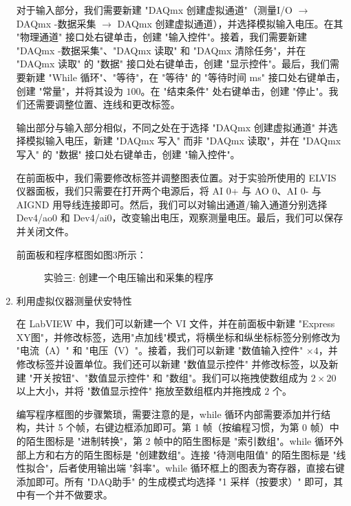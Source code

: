 \documentclass[11pt]{article}
\begin{document}
\begin{enumerate}
对于输入部分，我们需要新建 "DAQmx 创建虚拟通道"（测量I/O $\to$ DAQmx -数据采集 $\to$ DAQmx 创建虚拟通道），并选择模拟输入电压。在其 "物理通道" 接口处右键单击，创建 "输入控件"。接着，我们需要新建 "DAQmx -数据采集"、"DAQmx 读取" 和 "DAQmx 清除任务"，并在 "DAQmx 读取" 的 "数据" 接口处右键单击，创建 "显示控件"。最后，我们需要新建 "While 循环"、"等待"，在 "等待" 的 "等待时间 ms" 接口处右键单击，创建 "常量"，并将其设为 $100$。在 "结束条件" 处右键单击，创建 "停止"。我们还需要调整位置、连线和更改标签。
  
输出部分与输入部分相似，不同之处在于选择 "DAQmx 创建虚拟通道" 并选择模拟输入电压，新建 "DAQmx 写入" 而非 "DAQmx 读取"，并在 "DAQmx 写入" 的 "数据" 接口处右键单击，创建 "输入控件"。
  
在前面板中，我们需要修改标签并调整图表位置。对于实验所使用的 ELVIS 仪器面板，我们只需要在打开两个电源后，将 AI 0+ 与 AO 0、AI 0- 与 AIGND 用导线连接即可。然后，我们可以对输出通道/输入通道分别选择 Dev4/ao0 和 Dev4/ai0，改变输出电压，观察测量电压。最后，我们可以保存并关闭文件。
  
前面板和程序框图如图3所示：
  
\begin{figure}[H]
    \centering
    \hspace{0.5cm}
    \caption{实验三: 创建一个电压输出和采集的程序}
\end{figure}
  
\item 利用虚拟仪器测量伏安特性
  
在 LabVIEW 中，我们可以新建一个 VI 文件，并在前面板中新建 "Express XY图"，并修改标签，选用"点加线"模式，将横坐标和纵坐标标签分别修改为 "电流（A）" 和 "电压（V）"。接着，我们可以新建 "数值输入控件" $\times 4$，并修改标签并设置单位。我们还可以新建 "数值显示控件" 并修改标签，以及新建 "开关按钮"、"数值显示控件" 和 "数组"。我们可以拖拽使数组成为 $2\times 20$ 以上大小，并将 "数值显示控件" 拖放至数组框内并拖拽成 $2$ 个。
  
编写程序框图的步骤繁琐，需要注意的是，while 循环内部需要添加并行结构，共计 5 个帧，右键边框添加即可。第 1 帧（按编程习惯，为第 0 帧）中的陌生图标是 "进制转换"，第 2 帧中的陌生图标是 "索引数组"。while 循环外部上方和右方的陌生图标是 "创建数组"。连接 "待测电阻值" 的陌生图标是 "线性拟合"，后者使用输出端 "斜率"。while 循环框上的图表为寄存器，直接右键添加即可。所有 "DAQ助手" 的生成模式均选择 "1 采样（按要求）" 即可，其中有一个并不做要求。
  

\end{enumerate}
\end{document}
